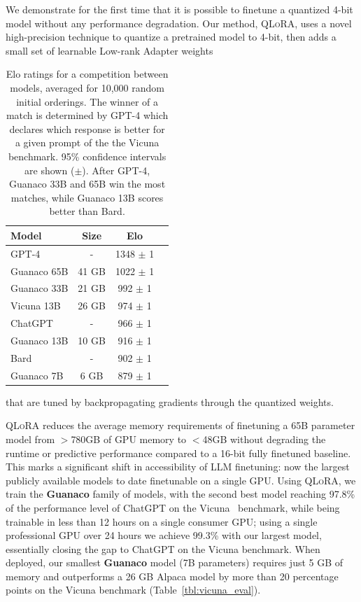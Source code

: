 \documentclass{article}
\newcommand{\method}{\textsc{QLoRA}\xspace}
\newcommand{\bfmodel}{\textbf{Guanaco}\xspace}
\newcommand{\benchv}{the Vicuna benchmark\xspace}
\begin{document}
We demonstrate for the first time that it is possible to finetune a quantized 4-bit model without any performance degradation. Our method, \method, uses a novel high-precision technique to quantize a pretrained model to 4-bit, 
then adds a small set of learnable Low-rank Adapter weights \citep{hu2021lora} 
\begin{table}
\centering
\vspace{-5pt}
\caption{Elo ratings for a competition between models, averaged for 10,000 random initial orderings. The winner of a match is determined by GPT-4 which declares which response is better for a given prompt of the \benchv. 95\% confidence intervals are shown ($\pm$). After GPT-4, Guanaco 33B and 65B win the most matches, while Guanaco 13B scores better than Bard.}
\label{tbl:elo}
\begin{tabular}{lccr}\toprule
Model & Size & Elo \\\midrule
GPT-4 & - & 1348 $\pm$ 1 \\
Guanaco 65B & 41 GB & 1022 $\pm$ 1 \\
Guanaco 33B & 21 GB & \hspace{1.75mm}992 $\pm$ 1 \\
Vicuna 13B & 26 GB & \hspace{1.75mm}974 $\pm$  1\\
ChatGPT & - & \hspace{1.75mm}966  $\pm$ 1 \\
Guanaco 13B & 10 GB & \hspace{1.75mm}916 $\pm$ 1 \\
Bard & - & \hspace{1.75mm}902 $\pm$ 1 \\
Guanaco 7B & 6 GB & \hspace{1.75mm}879 $\pm$ 1\\\bottomrule
\end{tabular}
\vspace{-10pt}
\end{table}
that are tuned by backpropagating gradients through the quantized weights. 

\method reduces the average memory requirements of finetuning a 65B parameter model from $>$780GB of GPU memory to $<$48GB without degrading the runtime or predictive performance compared to a 16-bit fully finetuned baseline.
This marks a significant shift in accessibility of LLM finetuning: now the largest publicly available models to date finetunable on a single GPU.
Using \method, we train the \bfmodel family of models, with the second best model reaching 97.8\% of the performance level of ChatGPT on the Vicuna~\citep{vicuna2023} benchmark, while being trainable in less than 12 hours on a single consumer GPU; using a single professional GPU over 24 hours we achieve 99.3\% with our largest model, essentially closing the gap to ChatGPT on the Vicuna benchmark. When deployed, our smallest \bfmodel model (7B parameters) requires just 5 GB of memory and outperforms a 26 GB Alpaca model by more than 20 percentage points on the Vicuna benchmark (Table~\ref{tbl:vicuna_eval}).
\end{document}
